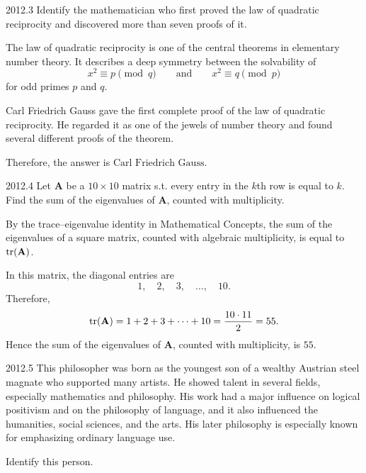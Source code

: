     \begin{pastproblem}{2012.3}
        Identify the mathematician who first proved the law of quadratic reciprocity and discovered
        more than seven proofs of it.
    \end{pastproblem}

    \begin{solution}
        The law of quadratic reciprocity is one of the central theorems in elementary number theory.
        It describes a deep symmetry between the solvability of
        \[
            x^2\equiv p \pmod q
            \qquad\text{and}\qquad
            x^2\equiv q \pmod p
        \]
        for odd primes $p$ and $q$.

        Carl Friedrich Gauss gave the first complete proof of the law of quadratic reciprocity. He
        regarded it as one of the jewels of number theory and found several different proofs of the
        theorem.

        Therefore, the answer is $\boxed{\text{Carl Friedrich Gauss}}$.
    \end{solution}

    \begin{pastproblem}{2012.4}
        Let $\mathbf{A}$ be a $10\times 10$ matrix s.t. every entry in the $k$th row is equal
        to $k$. Find the sum of the eigenvalues of $\mathbf{A}$, counted with multiplicity.
    \end{pastproblem}

    \begin{solution}
        By the trace--eigenvalue identity in Mathematical Concepts, the sum of the eigenvalues of a square matrix, counted with algebraic multiplicity, is equal
        to $\operatorname{tr}(\mathbf{A})$.

        In this matrix, the diagonal entries are
        \[
            1,\quad 2,\quad 3,\quad \dots,\quad 10.
        \]
        Therefore,
        \[
            \operatorname{tr}(\mathbf{A})
            =
            1+2+3+\cdots+10
            =
            \frac{10\cdot 11}{2}
            =
            55.
        \]
        Hence the sum of the eigenvalues of $\mathbf{A}$, counted with multiplicity, is
        $\boxed{55}$.
    \end{solution}

    \begin{pastproblem}{2012.5}
        This philosopher was born as the youngest son of a wealthy Austrian steel magnate who
        supported many artists. He showed talent in several fields, especially mathematics and
        philosophy. His work had a major influence on logical positivism and on the philosophy of
        language, and it also influenced the humanities, social sciences, and the arts. His later
        philosophy is especially known for emphasizing ordinary language use.

        Identify this person.
    \end{pastproblem}

